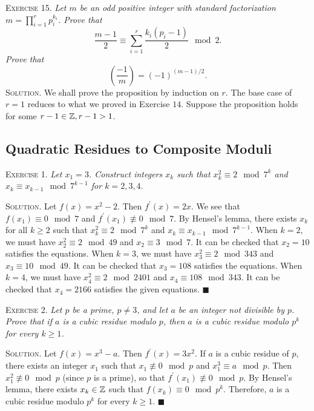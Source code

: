 \documentclass[11pt, leqno]{article}
\newcommand{\done}{\ensuremath{\blacksquare}}
\begin{document}
\textsc{Exercise 15}. \emph{Let $m$ be an odd positive integer with standard factorization $m = \prod_{i=1}^r p_i^{k_i}$. Prove that 
\begin{displaymath}
\frac{m-1}{2} \equiv \sum_{i=1}^r \frac{k_i(p_i-1)}{2} \mod 2.
\end{displaymath}Prove that 
\begin{displaymath}
\left( \frac{-1}{m} \right) = (-1)^{(m-1)/2}.
\end{displaymath}}\textsc{Solution}. We shall prove the proposition by induction on $r$. The base case of $r=1$ reduces to what we proved in Exercise $14$. Suppose the proposition holds for some $r-1\in \mathbb{Z}, r-1>1$.

\subsection{Quadratic Residues to Composite Moduli}

\textsc{Exercise 1}. \emph{Let $x_1 = 3$. Construct integers $x_k$ such that $x_k^2 \equiv 2 \mod 7^k$ and $x_k \equiv x_{k-1} \mod 7^{k-1}$ for $k=2,3,4$.}

\textsc{Solution}. Let $f(x) = x^2-2$. Then $f^{\prime}(x) = 2x$. We see that $f(x_1) \equiv 0 \mod 7$ and $f^{\prime}(x_1) \not\equiv 0 \mod 7$. By Hensel's lemma, there exists $x_k$ for all $k\geq 2$ such that $x_k^2 \equiv 2 \mod 7^k$ and $x_k \equiv x_{k-1} \mod 7^{k-1}$. When $k=2$, we must have $x_2^2 \equiv 2 \mod 49$ and $x_2 \equiv 3 \mod 7$. It can be checked that $x_2=10$ satisfies the equations. When $k=3$, we must have $x_3^2 \equiv 2 \mod 343$ and $x_3 \equiv 10 \mod 49$. It can be checked that $x_3 = 108$ satisfies the equations. When $k=4$, we must have $x_4^2 \equiv 2\mod 2401$ and $x_4 \equiv 108 \mod 343$. It can be checked that $x_4 = 2166$ satisfies the given equations. \done

\textsc{Exercise 2}. \emph{Let $p$ be a prime, $p\ne 3$, and let $a$ be an integer not divisible by $p$. Prove that if $a$ is a cubic residue modulo $p$, then $a$ is a cubic residue modulo $p^k$ for every $k \geq 1$.}

\textsc{Solution}. Let $f(x) = x^3 - a$. Then $f^{\prime}(x) = 3x^2$. If $a$ is a cubic residue of $p$, there exists an integer $x_1$ such that $x_1 \not \equiv 0 \mod p$ and $x_1^3 \equiv a \mod p$. Then $x_1^2 \not\equiv 0 \mod p$ (since $p$ is a prime), so that $f^{\prime}(x_1) \not\equiv 0 \mod p$. By Hensel's lemma, there exists $x_k \in \mathbb{Z}$ such that $f(x_k) \equiv 0 \mod p^k$. Therefore, $a$ is a cubic residue modulo $p^k$ for every $k\geq 1$. \done
\end{document}
